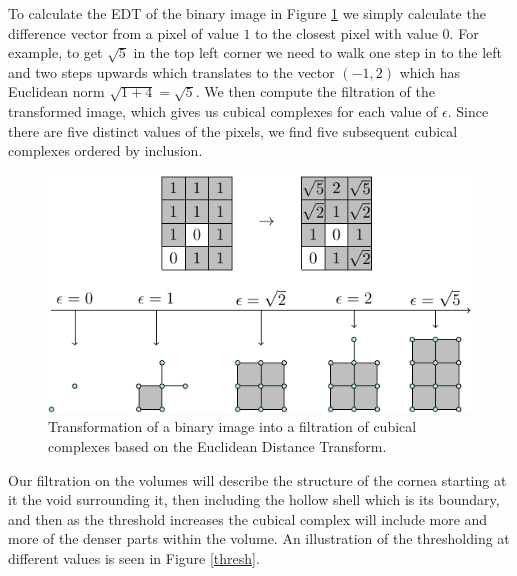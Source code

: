 \begin{example}
  To calculate the EDT of the binary image in Figure \ref{edt} we simply calculate the difference vector from a pixel of value $1$ to the closest pixel with value $0$. For example, to get $\sqrt 5$ in the top left corner we need to walk one step in to the left and two steps upwards which translates to the vector $(-1,2)$ which has Euclidean norm $\sqrt{1+4}=\sqrt{5}$. We then compute the filtration of the transformed image, which gives us cubical complexes for each value of $\epsilon$. Since there are five distinct values of the pixels, we find  five subsequent cubical complexes ordered by inclusion.

  \begin{figure}[ht]
    \centering
    \includegraphics[scale=1]{cubicalfiltration.pdf}
    \caption{\label{edt} Transformation of a binary image into a filtration of cubical complexes based on the Euclidean Distance Transform.}
  \end{figure}

\end{example}

Our filtration on the volumes will describe the structure of the cornea starting at it the void surrounding it, then including the hollow shell which is its boundary, and then as the threshold increases the cubical complex will include more and more of the denser parts within the volume. An illustration of the thresholding at different values is seen in Figure \ref{thresh}.


